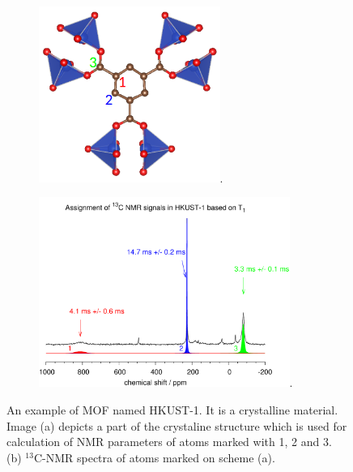 \documentclass[openany, longbibliography,slovene,a4paper,12pt]{article}
\begin{document}
 \begin{figure}
   \centering
      \begin{subfigure}[b]{0.5\textwidth}
  \centering
  \includegraphics[width=0.65\textwidth]{hkust_molekula_placeholder.png}.
  \caption{}
  \label{mof_molecule}
\end{subfigure}%
   \begin{subfigure}[b]{0.5\textwidth}
  \centering
  \includegraphics[width=0.9\textwidth]{hkust_spekter.png}.
  \caption{}
\end{subfigure}
  \caption{ An example of MOF named HKUST-1. It is a crystalline
    material. Image (a) depicts a part of the crystaline structure which is used for calculation of
    NMR parameters of atoms marked with 1, 2 and 3. (b) $^{13}\mathrm{C}$-NMR
    spectra of atoms marked on scheme (a).
  }
  \label{mof_spectre}
  \end{figure}
\end{document}
